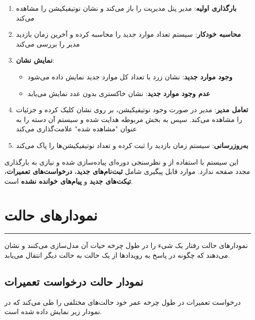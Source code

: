 \documentclass[12pt,a4paper]{report}
\begin{document}
	\begin{enumerate}
		\item \textbf{بارگذاری اولیه}: مدیر پنل مدیریت را باز می‌کند و نشان نوتیفیکیشن را مشاهده می‌کند
		
		\item \textbf{محاسبه خودکار}: سیستم تعداد موارد جدید را محاسبه کرده و آخرین زمان بازدید مدیر را بررسی می‌کند
		
		\item \textbf{نمایش نشان}: 
		\begin{itemize}
			\item \textbf{وجود موارد جدید}: نشان زرد با تعداد کل موارد جدید نمایش داده می‌شود
			\item \textbf{عدم وجود موارد جدید}: نشان خاکستری بدون عدد نمایش می‌یابد
		\end{itemize}
		
		\item \textbf{تعامل مدیر}: مدیر در صورت وجود نوتیفیکیشن، بر روی نشان کلیک کرده و جزئیات را مشاهده می‌کند. سپس به بخش مربوطه هدایت شده و سیستم آن دسته را به عنوان "مشاهده شده" علامت‌گذاری می‌کند
		
		\item \textbf{به‌روزرسانی}: سیستم زمان بازدید را ثبت کرده و تعداد نوتیفیکیشن‌ها را پاک می‌کند
	\end{enumerate}
	
	این سیستم با استفاده از  و نظرسنجی دوره‌ای پیاده‌سازی شده و نیازی به بارگذاری مجدد صفحه ندارد. موارد قابل پیگیری شامل \textbf{ثبت‌نام‌های جدید}، \textbf{درخواست‌های تعمیرات}، \textbf{تیکت‌های جدید} و \textbf{پیام‌های خوانده نشده} است.
	
	\section{نمودارهای حالت }
	
	\noindent\rule{\textwidth}{0.4pt}
	
	نمودارهای حالت رفتار یک شیء را در طول چرخه حیات آن مدل‌سازی می‌کنند و نشان می‌دهند که چگونه در پاسخ به رویدادها از یک حالت به حالت دیگر انتقال می‌یابد.
	
	\subsection{نمودار حالت درخواست تعمیرات}
	
	درخواست تعمیرات در طول چرخه عمر خود حالت‌های مختلفی را طی می‌کند که در نمودار زیر نمایش داده شده است.
	
\end{document}
